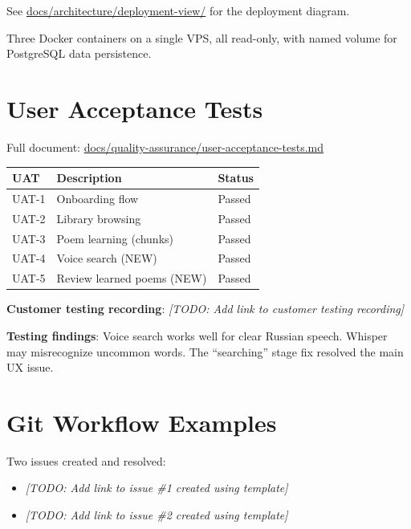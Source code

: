 \documentclass[11pt, a4paper]{article}
\begin{document}
See \href{https://github.com/d13-l1t3/PoetryForYou/tree/main/docs/architecture/deployment-view}{docs/architecture/deployment-view/} for the deployment diagram.

Three Docker containers on a single VPS, all read-only, with named volume for PostgreSQL data persistence.

\section{User Acceptance Tests}

Full document: \href{https://github.com/d13-l1t3/PoetryForYou/blob/main/docs/quality-assurance/user-acceptance-tests.md}{docs/quality-assurance/user-acceptance-tests.md}

\begin{longtable}{lll}
\toprule
\textbf{UAT} & \textbf{Description} & \textbf{Status} \\
\midrule
UAT-1 & Onboarding flow & Passed \\
UAT-2 & Library browsing & Passed \\
UAT-3 & Poem learning (chunks) & Passed \\
UAT-4 & Voice search (NEW) & Passed \\
UAT-5 & Review learned poems (NEW) & Passed \\
\bottomrule
\end{longtable}

\textbf{Customer testing recording}: \textit{[TODO: Add link to customer testing recording]}

\textbf{Testing findings}: Voice search works well for clear Russian speech. Whisper may misrecognize uncommon words. The ``searching'' stage fix resolved the main UX issue.

\section{Git Workflow Examples}

Two issues created and resolved:

\begin{itemize}
    \item \textit{[TODO: Add link to issue \#1 created using template]}
    \item \textit{[TODO: Add link to issue \#2 created using template]}
\end{itemize}
\end{document}
